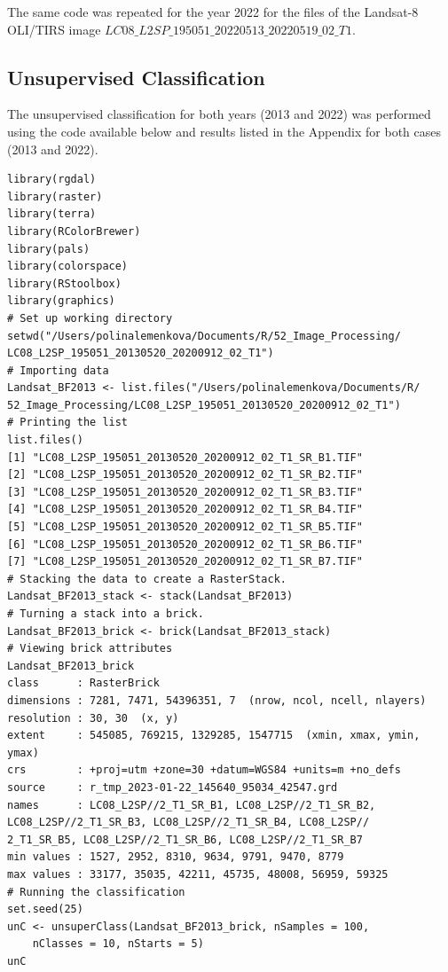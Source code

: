 \documentclass[knowledge,article,submit,pdftex,moreauthors]{Definitions/mdpi}
\begin{document}
The same code was repeated for the year 2022 for the files of the Landsat-8 OLI/TIRS image $LC08\_L2SP\_195051\_20220513\_20220519\_02\_T1$.

 \subsection{Unsupervised Classification}
The unsupervised classification for both years (2013 and 2022) was performed using the code available below and results listed in the Appendix for both cases (2013 and 2022). 

\begin{small}
\begin{verbatim}
library(rgdal)
library(raster)
library(terra)
library(RColorBrewer)
library(pals)
library(colorspace)
library(RStoolbox)
library(graphics)
# Set up working directory
setwd("/Users/polinalemenkova/Documents/R/52_Image_Processing/
LC08_L2SP_195051_20130520_20200912_02_T1")
# Importing data
Landsat_BF2013 <- list.files("/Users/polinalemenkova/Documents/R/
52_Image_Processing/LC08_L2SP_195051_20130520_20200912_02_T1")
# Printing the list
list.files()
[1] "LC08_L2SP_195051_20130520_20200912_02_T1_SR_B1.TIF"
[2] "LC08_L2SP_195051_20130520_20200912_02_T1_SR_B2.TIF"
[3] "LC08_L2SP_195051_20130520_20200912_02_T1_SR_B3.TIF"
[4] "LC08_L2SP_195051_20130520_20200912_02_T1_SR_B4.TIF"
[5] "LC08_L2SP_195051_20130520_20200912_02_T1_SR_B5.TIF"
[6] "LC08_L2SP_195051_20130520_20200912_02_T1_SR_B6.TIF"
[7] "LC08_L2SP_195051_20130520_20200912_02_T1_SR_B7.TIF"
# Stacking the data to create a RasterStack. 
Landsat_BF2013_stack <- stack(Landsat_BF2013)
# Turning a stack into a brick. 
Landsat_BF2013_brick <- brick(Landsat_BF2013_stack)
# Viewing brick attributes
Landsat_BF2013_brick
class      : RasterBrick 
dimensions : 7281, 7471, 54396351, 7  (nrow, ncol, ncell, nlayers)
resolution : 30, 30  (x, y)
extent     : 545085, 769215, 1329285, 1547715  (xmin, xmax, ymin, ymax)
crs        : +proj=utm +zone=30 +datum=WGS84 +units=m +no_defs 
source     : r_tmp_2023-01-22_145640_95034_42547.grd 
names      : LC08_L2SP//2_T1_SR_B1, LC08_L2SP//2_T1_SR_B2, 
LC08_L2SP//2_T1_SR_B3, LC08_L2SP//2_T1_SR_B4, LC08_L2SP//
2_T1_SR_B5, LC08_L2SP//2_T1_SR_B6, LC08_L2SP//2_T1_SR_B7 
min values : 1527, 2952, 8310, 9634, 9791, 9470, 8779 
max values : 33177, 35035, 42211, 45735, 48008, 56959, 59325
# Running the classification
set.seed(25)
unC <- unsuperClass(Landsat_BF2013_brick, nSamples = 100, 
	nClasses = 10, nStarts = 5)
unC
\end{verbatim} 
\end{small}
\end{document}
